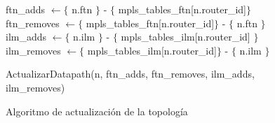 \begin{figure}[ht!]
\begin{algorithm}[H]
{{ 	ftn\_adds $\gets \lbrace$ n.ftn $\rbrace$ - $\lbrace$ mpls\_tables\_ftn[n.router\_id]$\rbrace$\\
    ftn\_removes $\gets \lbrace$ mpls\_tables\_ftn[n.router\_id]$\rbrace$ - $\lbrace$ n.ftn $\rbrace$\\
    ilm\_adds $\gets \lbrace$ n.ilm $\rbrace$ - $\lbrace$ mpls\_tables\_ilm[n.router\_id] $\rbrace$\\
	ilm\_removes $\gets \lbrace$ mpls\_tables\_ilm[n.router\_id]$\rbrace$ - $\lbrace$ n.ilm $\rbrace$\\		
	\vspace{0.2cm}
	
	ActualizarDatapath(n, ftn\_adds, ftn\_removes, ilm\_adds, ilm\_removes)\\
	
 	}  	
 }  
\end{algorithm}
\caption{Algoritmo de actualización de la topolog\'ia}
\label{fig:AlgoritmoDA1}
\end{figure}

